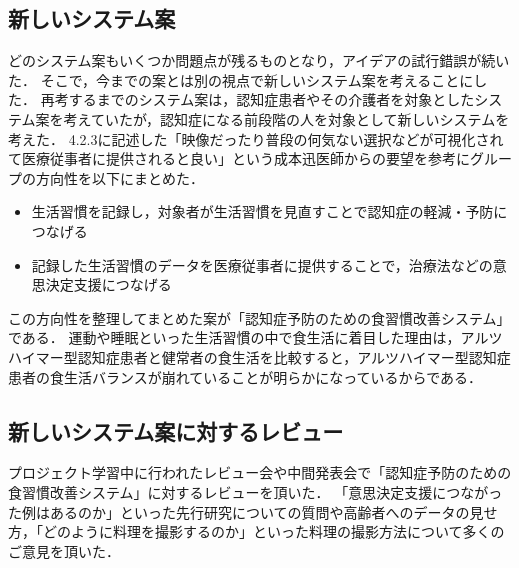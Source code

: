 \documentclass[../report]{subfiles}
\begin{document}
\subsection{新しいシステム案}
どのシステム案もいくつか問題点が残るものとなり，アイデアの試行錯誤が続いた．
そこで，今までの案とは別の視点で新しいシステム案を考えることにした．
再考するまでのシステム案は，認知症患者やその介護者を対象としたシステム案を考えていたが，認知症になる前段階の人を対象として新しいシステムを考えた．
4.2.3に記述した「映像だったり普段の何気ない選択などが可視化されて医療従事者に提供されると良い」という成本迅医師からの要望を参考にグループの方向性を以下にまとめた．

\begin{itemize}
    \item 生活習慣を記録し，対象者が生活習慣を見直すことで認知症の軽減・予防につなげる
    \item 記録した生活習慣のデータを医療従事者に提供することで，治療法などの意思決定支援につなげる
\end{itemize}

この方向性を整理してまとめた案が「認知症予防のための食習慣改善システム」である．
運動や睡眠といった生活習慣の中で食生活に着目した理由は，アルツハイマー型認知症患者と健常者の食生活を比較すると，アルツハイマー型認知症患者の食生活バランスが崩れている\cite{dementia-nutrition}ことが明らかになっているからである．

\subsection{新しいシステム案に対するレビュー}
プロジェクト学習中に行われたレビュー会や中間発表会で「認知症予防のための食習慣改善システム」に対するレビューを頂いた．
「意思決定支援につながった例はあるのか」といった先行研究についての質問や高齢者へのデータの見せ方，「どのように料理を撮影するのか」といった料理の撮影方法について多くのご意見を頂いた．
\end{document}
